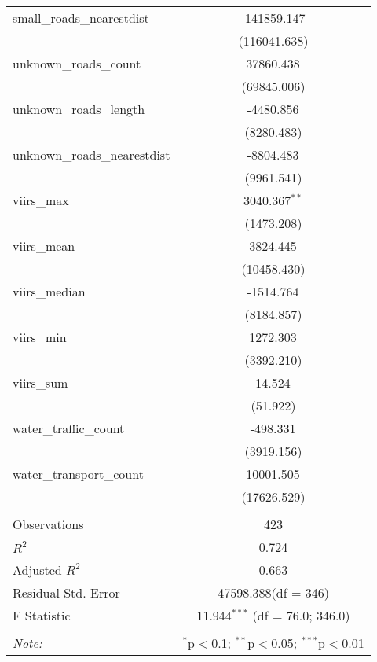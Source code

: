 \begin{table}[!htbp]
\begin{tabular}{@{\extracolsep{5pt}}lc}
 small_roads_nearestdist & -141859.147$^{}$ \\
  & (116041.638) \\
 unknown_roads_count & 37860.438$^{}$ \\
  & (69845.006) \\
 unknown_roads_length & -4480.856$^{}$ \\
  & (8280.483) \\
 unknown_roads_nearestdist & -8804.483$^{}$ \\
  & (9961.541) \\
 viirs_max & 3040.367$^{**}$ \\
  & (1473.208) \\
 viirs_mean & 3824.445$^{}$ \\
  & (10458.430) \\
 viirs_median & -1514.764$^{}$ \\
  & (8184.857) \\
 viirs_min & 1272.303$^{}$ \\
  & (3392.210) \\
 viirs_sum & 14.524$^{}$ \\
  & (51.922) \\
 water_traffic_count & -498.331$^{}$ \\
  & (3919.156) \\
 water_transport_count & 10001.505$^{}$ \\
  & (17626.529) \\
\hline \\[-1.8ex]
 Observations & 423 \\
 $R^2$ & 0.724 \\
 Adjusted $R^2$ & 0.663 \\
 Residual Std. Error & 47598.388(df = 346)  \\
 F Statistic & 11.944$^{***}$ (df = 76.0; 346.0) \\
\hline
\hline \\[-1.8ex]
\textit{Note:} & \multicolumn{1}{r}{$^{*}$p$<$0.1; $^{**}$p$<$0.05; $^{***}$p$<$0.01} \\
\end{tabular}
\end{table}